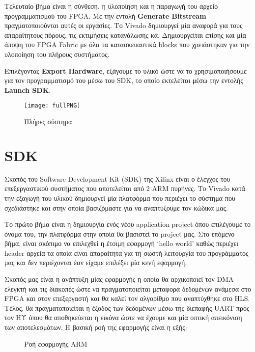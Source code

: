 Τελευταίο βήμα είναι η σύνθεση, η υλοποίηση και η παραγωγή του αρχείο προγραμματισμού του FPGA. Με την εντολή \textbf{Generate Bitstream} πραγματοποιούνται αυτές οι εργασίες. Το Vivado δημιουργεί μία αναφορά για τους απαραίτητους πόρους, τις εκτιμήσεις κατανάλωσης κά. Δημιουργείται επίσης και μία άποψη του FPGA Fabric με όλα τα κατασκευαστικά blocks που χρειάστηκαν για την υλοποίηση του πλήρους συστήματος.

Επιλέγοντας \textbf{Export Hardware}, εξάγουμε το υλικό ώστε να το χρησιμοποιήσουμε για τον προγραμματισμό του μέσω του SDK, το οποίο εκτελείται μέσω την εντολής \textbf{Launch SDK}.
\newpage
\begin{figure}[H]
   \centering
\texttt{[image: fullPNG]}
   \caption{Πλήρες σύστημα}
\end{figure}
\newpage
\section{SDK}\label{SDK}

Σκοπός του Software Development Kit (SDK) της Xilinx είναι ο έλεγχος του επεξεργαστικού συστήματος που αποτελείται από 2 ARM πυρήνες. Το Vivado κατά την εξαγωγή του υλικού δημιουργεί μία πλατφόρμα που περιέχει το σύστημα που σχεδιάστηκε και στην οποία βασιζόμαστε για να αναπτύξουμε τον κώδικα μας.

Το πρώτο βήμα είναι η δημιουργία ενός νέου application project όπου επιλέγουμε το όνομα του, την πλατφόρμα στην οποία θα βασιστεί το project μας. Στο επόμενο βήμα, είναι σκόπιμο να επιλεχθεί η έτοιμη εφαρμογή `hello world' καθώς περιέχει header αρχεία τα οποία είναι απαραίτητα για τη σωστή λειτουργία του προγράμματος μας και δεν περιέχονται έαν είχαμε επιλέξει μία κενή εφαρμογή.

Σκοπός μας είναι η ανάπτυξη μίας εφαρμογής η οποία θα αρχικοποιεί τον DMA ελεγκτή και τις διακοπές ώστε να πραγματοποιείται μεταφορά δεδομένων ανάμεσα στο FPGA και στον επεξεργαστή και θα καλεί τον αλγορίθμο που αναπτύχθηκε στο HLS. Τέλος, θα πραγματοποιείται η έξοδος των δεδομένων μέσω της διεπαφής UART προς τον ΗΥ όπου θα αποθηκεύεται η εικόνα ώστε να έχουμε και μία οπτική απεικόνιση των αποτελεσμάτων. Η βασική ροή της εφαρμογής είναι η εξής:
\begin{figure}[H]
\begin{center}
\end{center}
\caption{Ροή εφαρμογής ARM}
\end{figure}
